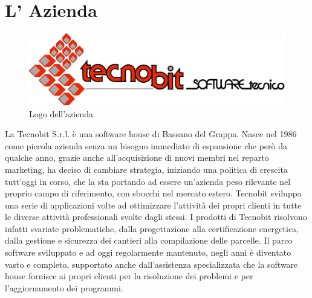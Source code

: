 \section{L' Azienda}

\begin{figure}[!ht]
\centering
 \includegraphics[scale=0.3]{./images/tecnobit.jpg}
\caption{Logo dell'azienda}
\end{figure}

\noindent La Tecnobit S.r.l. \`e una software house di Bassano del Grappa. Nasce nel 1986 come piccola azienda senza un bisogno immediato di espansione che per\`o da qualche anno, grazie anche all'acquisizione di nuovi membri nel reparto marketing, ha deciso di cambiare strategia, iniziando una politica di crescita tutt'oggi in corso, che la sta portando ad essere un'azienda peso rilevante nel proprio campo di riferimento, con sbocchi nel mercato estero. Tecnobit sviluppa una serie di applicazioni volte ad ottimizzare l’attivit\` a dei propri clienti in tutte le diverse attivit\`a professionali svolte dagli stessi. I prodotti di Tecnobit risolvono infatti svariate problematiche, dalla progettazione alla certificazione energetica, dalla gestione e sicurezza dei cantieri alla compilazione delle parcelle. Il parco software sviluppato e ad oggi regolarmente mantenuto, negli anni \` e diventato vasto e completo, supportato anche dall'assistenza specializzata che la software house fornisce ai propri clienti per la risoluzione dei problemi e per l'aggiornamento dei programmi.

